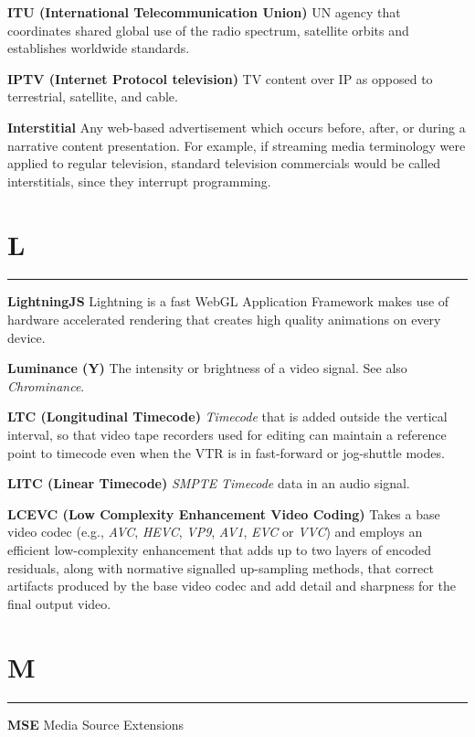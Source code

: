\smallskip
\textbf{ITU (International Telecommunication Union)}
UN agency that coordinates shared global use of the radio spectrum, satellite orbits and establishes worldwide standards.

\medskip
\textbf{IPTV (Internet Protocol television)}
TV content over IP as opposed to terrestrial, satellite, and cable.

\smallskip
\textbf{Interstitial}
Any web-based advertisement which occurs before, after, or during a narrative content presentation. For example, if streaming media terminology were applied to regular television, standard television commercials would be called interstitials, since they interrupt programming.

\section{L}
\hrule

\medskip
\textbf{LightningJS}
Lightning is a fast WebGL Application Framework makes use of hardware accelerated rendering that creates high quality animations on every device.

\smallskip
\textbf{Luminance (Y)}
The intensity or brightness of a video signal. See also \textit{Chrominance}.

\smallskip
\textbf{LTC (Longitudinal Timecode)}
\textit{Timecode} that is added outside the vertical interval, so that video tape recorders used for editing can maintain a reference point to timecode even when the VTR is in fast-forward or jog-shuttle modes.

\smallskip
\textbf{LITC (Linear Timecode)}
\textit{SMPTE} \textit{Timecode} data in an audio signal.

\smallskip
\textbf{LCEVC (Low Complexity Enhancement Video Coding)}
Takes a base video codec (e.g., \textit{AVC}, \textit{HEVC}, \textit{VP9}, \textit{AV1}, \textit{EVC} or \textit{VVC}) and employs an efficient low-complexity enhancement that adds up to two layers of encoded residuals, along with normative signalled up-sampling methods, that correct artifacts produced by the base video codec and add detail and sharpness for the final output video.


\section{M}
\hrule

\medskip
\textbf{MSE}
Media Source Extensions

